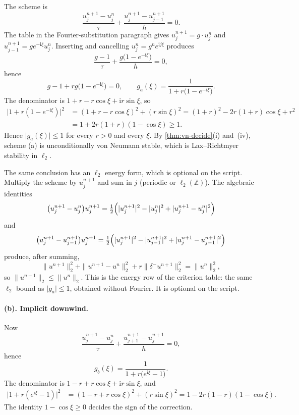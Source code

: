 \documentclass[11pt,a4paper]{article}
\begin{document}
The scheme is
\[
\frac{u_j^{n+1}-u_j^n}{\tau}
+
\frac{u_j^{n+1}-u_{j-1}^{n+1}}{h}
=0.
\]
The table in the Fourier-substitution paragraph gives \(u_j^{n+1}=g\cdot u_j^n\) and \(u_{j-1}^{n+1}=g e^{-\mathrm i\xi}u_j^n\). Inserting and cancelling \(u_j^n=g^n e^{\mathrm i j\xi}\) produces
\[
\frac{g-1}{\tau}
+
\frac{g\bigl(1-e^{-\mathrm i\xi}\bigr)}{h}
=0,
\]
hence
\[
g-1+r g\bigl(1-e^{-\mathrm i\xi}\bigr)=0,
\qquad
g_a(\xi)
=
\frac{1}{1+r\bigl(1-e^{-\mathrm i\xi}\bigr)}.
\]
The denominator is \(1+r-r\cos\xi+\mathrm i r\sin\xi\), so
\begin{align*}
\bigl|1+r(1-e^{-\mathrm i\xi})\bigr|^2
&=
(1+r-r\cos\xi)^2+(r\sin\xi)^2
=
(1+r)^2-2r(1+r)\cos\xi+r^2
\\
&=
1+2r(1+r)(1-\cos\xi)
\ge
1.
\end{align*}
Hence \(\lvert g_a(\xi)\rvert\le 1\) for every \(r>0\) and every \(\xi\). By \cref{thm:vn-decide}(i) and~(iv), scheme (a) is unconditionally von Neumann stable, which is Lax--Richtmyer stability in \(\ell_2\).

The same conclusion has an \(\ell_2\) energy form, which is optional on the script. Multiply the scheme by \(u_j^{n+1}\) and sum in \(j\) (periodic or \(\ell_2(\mathbb Z)\)). The algebraic identities
\[
\bigl(u_j^{n+1}-u_j^n\bigr)u_j^{n+1}
=
\tfrac12\Bigl(\lvert u_j^{n+1}\rvert^2-\lvert u_j^n\rvert^2+\lvert u_j^{n+1}-u_j^n\rvert^2\Bigr)
\]
and
\[
\bigl(u_j^{n+1}-u_{j-1}^{n+1}\bigr)u_j^{n+1}
=
\tfrac12\Bigl(\lvert u_j^{n+1}\rvert^2-\lvert u_{j-1}^{n+1}\rvert^2+\lvert u_j^{n+1}-u_{j-1}^{n+1}\rvert^2\Bigr)
\]
produce, after summing,
\[
\|u^{n+1}\|_2^2
+
\|u^{n+1}-u^n\|_2^2
+
r\|\delta^-u^{n+1}\|_2^2
=
\|u^n\|_2^2,
\]
so \(\|u^{n+1}\|_2\le\|u^n\|_2\). This is the energy row of the criterion table: the same \(\ell_2\) bound as \(\lvert g_a\rvert\le 1\), obtained without Fourier. It is optional on the script.

\paragraph{(b). Implicit downwind.}

Now
\[
\frac{u_j^{n+1}-u_j^n}{\tau}
+
\frac{u_{j+1}^{n+1}-u_j^{n+1}}{h}
=0,
\]
hence
\[
g_b(\xi)
=
\frac{1}{1+r\bigl(e^{\mathrm i\xi}-1\bigr)}.
\]
The denominator is \(1-r+r\cos\xi+\mathrm i r\sin\xi\), and
\begin{align*}
\bigl|1+r(e^{\mathrm i\xi}-1)\bigr|^2
&=
(1-r+r\cos\xi)^2+(r\sin\xi)^2
=
1-2r(1-r)(1-\cos\xi).
\end{align*}
The identity \(1-\cos\xi\ge 0\) decides the sign of the correction.
\end{document}
